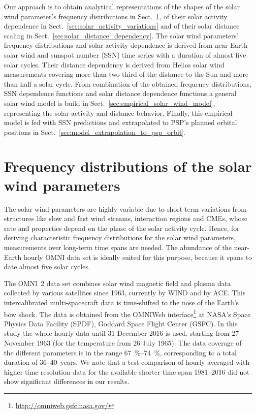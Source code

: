 \documentclass[]{aa}
\begin{document}
	Our approach is to obtain analytical representations of the shapes of the solar wind parameter’s frequency distributions in Sect.~\ref{sec:frequency_distribution}, of their solar activity dependence in Sect.~\ref{sec:solar_activity_variations} and of their solar distance scaling in Sect.~\ref{sec:solar_distance_dependency}. The solar wind parameters’ frequency distributions and solar activity dependence is derived from near-Earth solar wind and sunspot number (SSN) time series with a duration of almost five solar cycles. Their distance dependency is derived from Helios solar wind measurements covering more than two third of the distance to the Sun and more than half a solar cycle. From combination of the obtained frequency distributions, SSN dependence functions and solar distance dependence functions a general solar wind model is build in Sect.~\ref{sec:empirical_solar_wind_model}, representing the solar activity and distance behavior. Finally, this empirical model is fed with SSN predictions and extrapolated to PSP's planned orbital positions in Sect.~\ref{sec:model_extrapolation_to_psp_orbit}.

	\section{Frequency distributions of the solar wind parameters}
	\label{sec:frequency_distribution}
	The solar wind parameters are highly variable due to short-term variations from structures like slow and fast wind streams, interaction regions and CMEs, whose rate and properties depend on the phase of the solar activity cycle. Hence, for deriving characteristic frequency distributions for the solar wind parameters, measurements over long-term time spans are needed. The abundance of the near-Earth hourly OMNI data set is ideally suited for this purpose, because it spans to date almost five solar cycles.

	The OMNI~2 data set \citep{King2005} combines solar wind magnetic field and plasma data collected by various satellites since 1963, currently by WIND and by ACE. This intercalibrated multi-spacecraft data is time-shifted to the nose of the Earth’s bow shock. The data is obtained from the OMNIWeb interface\footnote{\url{http://omniweb.gsfc.nasa.gov/}} at NASA's Space Physics Data Facility (SPDF), Goddard Space Flight Center (GSFC).
	In this study the whole hourly data until 31 December 2016 is used, starting from 27 November 1963 (for the temperature from 26 July 1965). The data coverage of the different parameters is in the range \SIrange{67}{74}{\percent},  corresponding to a total duration of 36--40~years.
	We note that a test-comparison of hourly averaged with higher time resolution data for the available shorter time span 1981--2016 did not show significant differences in our results.
\end{document}
